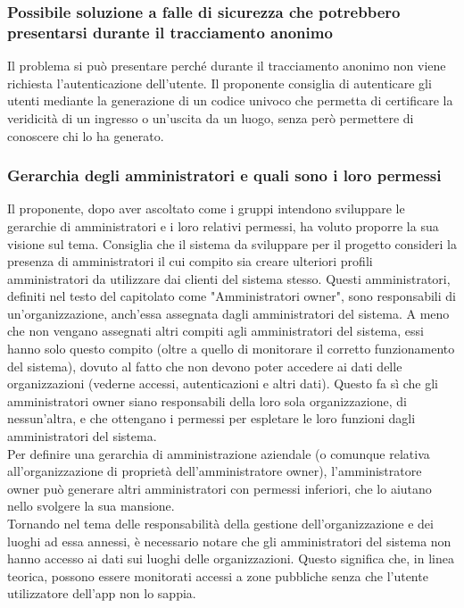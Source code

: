 \subsubsection*{Possibile soluzione a falle di sicurezza che potrebbero presentarsi durante il tracciamento anonimo}
Il problema si può presentare perché durante il tracciamento anonimo non viene richiesta l'autenticazione dell'utente.
Il proponente consiglia di autenticare gli utenti mediante la generazione di un codice univoco che permetta di certificare la veridicità di un ingresso o un'uscita da un luogo, senza però permettere di conoscere chi lo ha generato.

\subsubsection*{Gerarchia degli amministratori e quali sono i loro permessi}
Il proponente, dopo aver ascoltato come i gruppi intendono sviluppare le gerarchie di amministratori e i loro relativi permessi, ha voluto proporre la sua visione sul tema.
Consiglia che il sistema da sviluppare per il progetto consideri la presenza di amministratori il cui compito sia creare ulteriori profili amministratori da utilizzare
dai clienti del sistema stesso. Questi amministratori, definiti nel testo del capitolato come "Amministratori owner", sono responsabili di un'organizzazione, anch'essa assegnata dagli amministratori del sistema.
A meno che non vengano assegnati altri compiti agli amministratori del sistema, essi hanno solo questo compito (oltre a quello di monitorare il corretto funzionamento del sistema), dovuto al fatto che non devono poter accedere ai dati delle organizzazioni (vederne accessi, autenticazioni e altri dati).
Questo fa sì che gli amministratori owner siano responsabili della loro sola organizzazione, di nessun'altra, e che ottengano i permessi per espletare le loro funzioni dagli amministratori del sistema.\\
Per definire una gerarchia di amministrazione aziendale (o comunque relativa all'organizzazione di proprietà dell'amministratore owner), l'amministratore owner può generare altri amministratori con permessi inferiori, che lo aiutano nello svolgere la sua mansione.\\
Tornando nel tema delle responsabilità della gestione dell'organizzazione e dei luoghi ad essa annessi, è necessario notare che gli amministratori del sistema non hanno accesso ai dati sui luoghi delle organizzazioni.
Questo significa che, in linea teorica, possono essere monitorati accessi a zone pubbliche senza che l'utente utilizzatore dell'app non lo sappia.

